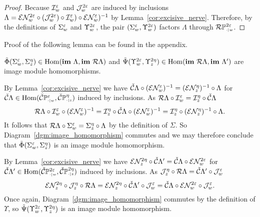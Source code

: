 \begin{proof}
  Because $\I_w^\e$ and $\J_w^{2\e}$ are induced by inclusions $\Lambda = \E\N_w^{2\e}\circ (\J_w^{2\e})\circ \I_w^\e)\circ \E\N_w^\e)^{-1}$ by Lemma~\ref{cor:excisive_nerve}.
  Therefore, by the definitions of $\Sigma_w^\e$ and $\Upsilon_w^{2\e}$, the pair $(\Sigma_w^\e, \Upsilon_w^{2\e})$ factors $\Lambda$ through $\RPP{w}{2\e}$.
\end{proof}

Proof of the following lemma can be found in the appendix.

\begin{lemma}\label{lem:rips_homomorphism_left}
  $\tilde{\Phi}(\Sigma_w^\e,\Sigma_z^\eta)\in\Hom(\im~\Lambda,\im~\rips\Lambda)$ and $\tilde{\Psi}(\Upsilon_w^{2\e},\Upsilon_z^{2\eta})\in\Hom(\im~\rips\Lambda,\im~\Lambda')$ are image module homomorphisms.
\end{lemma}
\proofatend
  By Lemma~\ref{cor:excisive_nerve} we have $\cech\Lambda\circ (\E\N_w^\e)^{-1} = (\E\N_z^\eta)^{-1}\circ \Lambda$ for $\cech\Lambda\in\Hom(\CPP{w}{\e},\CPP{z}{\eta})$ induced by inclusions.
  As $\rips\Lambda\circ\I_w^\e = \I_z^\eta\circ\cech\Lambda$
  \[ \rips\Lambda\circ \I_w^\e\circ(\E\N_w^\e)^{-1} = \I_z^\eta\circ\cech\Lambda\circ (\E\N_w^\e)^{-1} = \I_z^\eta\circ (\E\N_z^\eta)^{-1}\circ\Lambda.\]
  It follows that $\rips\Lambda\circ\Sigma_w^\e = \Sigma_z^\eta\circ\Lambda$ by the definition of $\Sigma$.
  So Diagram~\ref{dgm:image_homomorphism} commutes and we may therefore conclude that $\tilde{\Phi}(\Sigma_w^\e,\Sigma_z^\eta)$ is an image module homomorphism.

  By Lemma~\ref{cor:excisive_nerve} we have $\E\N_z^{2\eta} \circ\cech\Lambda'  = \cech \Lambda\circ \E\N_w^{2\e}$ for $\cech\Lambda'\in\Hom(\CPP{w}{2\e},\CPP{z}{2\eta})$ induced by inclusions.
  As $\J_z^\eta\circ \rips\Lambda = \cech\Lambda'\circ\J_w^\e$
  \[ \E\N_z^{2\eta}\circ \J_z^\eta\circ \rips\Lambda = \E\N_z^{2\eta}\circ\cech\Lambda'\circ\J_w^\e = \cech \Lambda\circ \E\N_w^{2\e}\circ\J_w^\e.\]
  Once again, Diagram~\ref{dgm:image_homomorphism} commutes by the definition of $\Upsilon$, so $\tilde{\Psi}(\Upsilon_w^{2\e},\Upsilon_z^{2\eta})$ is an image module homomorphism.
\endproofatend

